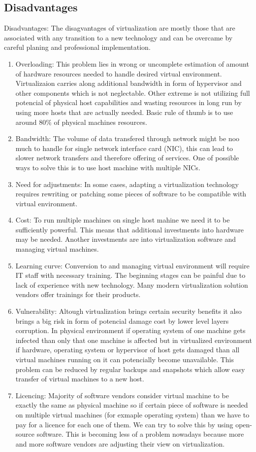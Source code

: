 \begin{enumerate}
\section{Disadvantages}
Disadvantages: 
The disagvantages of virtualization are mostly those that are associated with any transition to a new technology and can be overcame by careful planing and professional implementation.
\begin{enumerate}
\item Overloading: This problem lies in wrong or uncomplete estimation of amount of hardware resources needed to handle desired virtual environment. Virtualizaion carries along additional bandwidth in form of hypervisor and other components which is not neglectable. Other extreme is not utilizing full potencial of physical host capabilities and wasting resources in long run by using more hosts that are actually needed. Basic rule of thumb is to use around 80\% of physical machines resources.
\item Bandwidth: The volume of data transfered through network might be noo much to handle for single network interface card (NIC), this can lead to slower network transfers and therefore offering of services. One of possible ways to solve this is to use host machine with multiple NICs.
\item Need for adjustments: In some cases, adapting a virtualization technology requires rewriting or patching some pieces of software to be compatible with virtual environment.
\item Cost: To run multiple machines on single host mahine we need it to be sufficiently powerful. This means that additional investments into hardware may be needed. Another investments are into virtualization software and managing virtual machines.
\item Learning curve: Conversion to and managing virtual environment will require IT staff with necessary training. The beginning stages can be painful due to lack of experience with new technology. Many modern virtualization solution vendors offer trainings for their products.
\item Vulnerability: Altough virtualization brings certain security benefits it also brings a big risk in form of potencial damage cost by lower level layers corruption. In physical environment if operating system of one machine gets infected than only that one machine is affected but in virtualized environment if hardware, operating system or hypervisor of host gets damaged than all virtual machines running on it can potencially become unavailable. This problem can be reduced by regular backups and snapshots which allow easy transfer of virtual machines to a new host.
\item Licencing: Majority of software vendors consider virtual machine to be exactly the same as physical machine so if certain piece of software is needed on multiple virtual machines (for exmaple operating system) than we have to pay for a licence for each one of them. We can try to solve this by using open-source software. This is becoming less of a problem nowadays because more and more software vendors are adjusting their view on virtualization.
\end{enumerate}


\end{enumerate}
